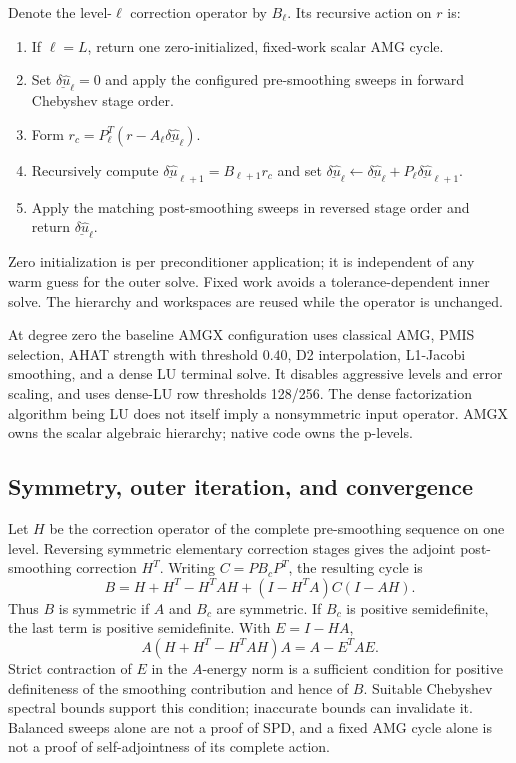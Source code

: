 \documentclass[11pt]{article}
\numberwithin{equation}{section}
\numberwithin{figure}{section}
\numberwithin{table}{section}
\begin{document}
Denote the level-$\ell$ correction operator by $B_\ell$. Its recursive action
on $r$ is:
\begin{enumerate}
\item If $\ell=L$, return one zero-initialized, fixed-work scalar AMG cycle.
\item Set $\underline{\delta\widehat{u}}_\ell=0$ and apply the configured pre-smoothing sweeps in forward
Chebyshev stage order.
\item Form $r_c=P_\ell^T(r-A_\ell\underline{\delta\widehat{u}}_\ell)$.
\item Recursively compute
$\underline{\delta\widehat{u}}_{\ell+1}=B_{\ell+1}r_c$ and set
$\underline{\delta\widehat{u}}_\ell\leftarrow
\underline{\delta\widehat{u}}_\ell+
P_\ell\underline{\delta\widehat{u}}_{\ell+1}$.
\item Apply the matching post-smoothing sweeps in reversed stage order and
return $\underline{\delta\widehat{u}}_\ell$.
\end{enumerate}
Zero initialization is per preconditioner application; it is independent of
any warm guess for the outer solve. Fixed work avoids a tolerance-dependent
inner solve. The hierarchy and workspaces are reused while the operator is
unchanged.

At degree zero the baseline AMGX configuration uses classical AMG, PMIS
selection, AHAT strength with threshold $0.40$, D2 interpolation, L1-Jacobi
smoothing, and a dense LU terminal solve. It disables aggressive levels and
error scaling, and uses dense-LU row thresholds 128/256. The dense factorization
algorithm being LU does not itself imply a nonsymmetric input operator.
AMGX owns the scalar algebraic hierarchy; native code owns the p-levels.

\subsection{Symmetry, outer iteration, and convergence}
Let $H$ be the correction operator of the complete pre-smoothing sequence on
one level. Reversing symmetric elementary correction stages gives the adjoint
post-smoothing correction $H^T$. Writing $C=PB_cP^T$, the resulting cycle is
\[
 B=H+H^T-H^TAH+(I-H^TA)C(I-AH).
\]
Thus $B$ is symmetric if $A$ and $B_c$ are symmetric. If $B_c$ is positive
semidefinite, the last term is positive semidefinite. With $E=I-HA$,
\[
 A(H+H^T-H^TAH)A=A-E^TAE.
\]
Strict contraction of $E$ in the $A$-energy norm is a sufficient condition for
positive definiteness of the smoothing contribution and hence of $B$.
Suitable Chebyshev spectral bounds support this condition; inaccurate bounds
can invalidate it. Balanced sweeps alone are not a proof of SPD, and a fixed
AMG cycle alone is not a proof of self-adjointness of its complete action.
\end{document}
